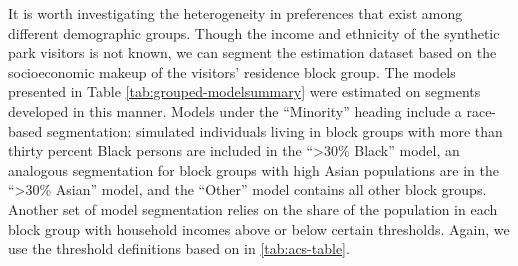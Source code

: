 \documentclass[3p, authoryear]{elsarticle} %
\begin{document}
It is worth investigating the heterogeneity in preferences that exist among
different demographic groups. Though the income and ethnicity of the synthetic
park visitors is not known, we can segment the estimation dataset based on the
socioeconomic makeup of the visitors' residence block group. The models presented in
Table \ref{tab:grouped-modelsummary} were
estimated on segments developed in this manner.
Models under the ``Minority'' heading include a
race-based segmentation: simulated individuals living in block groups with more
than thirty percent Black persons are included in the ``\textgreater30\% Black'' model, an
analogous segmentation for block groups with high Asian populations are in the
``\textgreater30\% Asian'' model, and the ``Other'' model contains all other block groups.
Another set of model segmentation relies on the share of the population in each
block group with household incomes above or below certain thresholds. Again,
we use the threshold definitions based on in \ref{tab:acs-table}.
\end{document}

